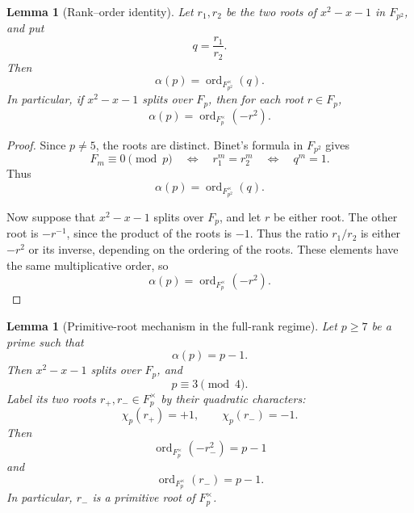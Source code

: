 \documentclass[preprint,12pt]{elsarticle}
\def\F{F}%
\numberwithin{equation}{section}
\theoremstyle{plain}
\newtheorem{lemma}[theorem]{Lemma}
\theoremstyle{definition}
\DeclareMathOperator{\ord}{ord}
\newcommand{\F}{\mathbb{F}}
\begin{document}
\begin{lemma}[Rank--order identity]\label{lem:rank-order}
Let $r_1,r_2$ be the two roots of $x^2-x-1$ in $\F_{p^2}$, and put
\[
q=\frac{r_1}{r_2}.
\]
Then
\[
\alpha(p)=\ord_{\F_{p^2}^\times}(q).
\]
In particular, if $x^2-x-1$ splits over $\F_p$, then for each root
$r\in\F_p$,
\[
\alpha(p)=\ord_{\F_p^\times}(-r^2).
\]
\end{lemma}
 
\begin{proof}
Since $p\ne5$, the roots are distinct. Binet's formula in
$\F_{p^2}$ gives
\[
F_m\equiv0\pmod p
\quad\Longleftrightarrow\quad
r_1^m=r_2^m
\quad\Longleftrightarrow\quad
q^m=1.
\]
Thus
\[
\alpha(p)=\ord_{\F_{p^2}^\times}(q).
\]
 
Now suppose that $x^2-x-1$ splits over $\F_p$, and let $r$ be either
root. The other root is $-r^{-1}$, since the product of the roots is
$-1$. Thus the ratio $r_1/r_2$ is either $-r^2$ or its inverse,
depending on the ordering of the roots. These elements have the same
multiplicative order, so
\[
\alpha(p)=\ord_{\F_p^\times}(-r^2).
\]
\end{proof}
 
\begin{lemma}[Primitive-root mechanism in the full-rank regime]
\label{lem:full-rank-primitivity}
Let $p\ge7$ be a prime such that
\[
\alpha(p)=p-1.
\]
Then $x^2-x-1$ splits over $\F_p$, and
\[
p\equiv3\pmod4.
\]
Label its two roots $r_+,r_-\in\F_p^\times$ by their quadratic
characters:
\[
\chi_p(r_+)=+1,
\qquad
\chi_p(r_-)=-1.
\]
Then
\[
\ord_{\F_p^\times}(-r_-^2)=p-1
\]
and
\[
\ord_{\F_p^\times}(r_-)=p-1.
\]
In particular, $r_-$ is a primitive root of $\F_p^\times$.
\end{lemma}
 
\end{document}
